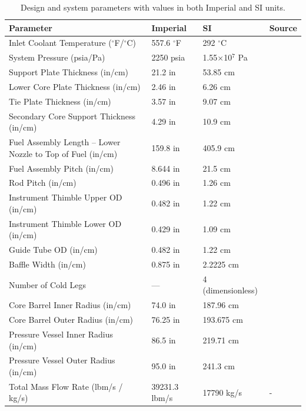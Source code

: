 \documentclass[review]{elsarticle}
\theoremstyle{definition}
\theoremstyle{definition}
\theoremstyle{remark}
\begin{document}
\begin{table}[!h]
\centering
\caption{Design and system parameters with values in both Imperial and SI units.}
\label{tab:design_data}
\renewcommand{\arraystretch}{1.2} %
\begin{tabular}{|l|l|l|l|}
\hline
\textbf{Parameter} & \textbf{Imperial} & \textbf{SI} & \textbf{Source} \\
\hline
Inlet Coolant Temperature ($^\circ$F/$^\circ$C) & 557.6 $^\circ$F & 292 $^\circ$C & \cite{ornl_sysdefdoc} \\
\hline
System Pressure (psia/Pa) & 2250 psia & 1.55$\times$10$^7$ Pa & \cite{horelik2013benchmark} \\
\hline
Support Plate Thickness (in/cm) & 21.2 in & 53.85 cm & \cite{wec_sysmanual} \\
\hline
Lower Core Plate Thickness (in/cm) & 2.46 in & 6.26 cm & \cite{wec_sysmanual} \\
\hline
Tie Plate Thickness (in/cm) & 3.57 in & 9.07 cm & \cite{wec_sysmanual} \\
\hline
Secondary Core Support Thickness (in/cm) & 4.29 in & 10.9 cm & \cite{wec_sysmanual} \\
\hline
Fuel Assembly Length – Lower Nozzle to Top of Fuel (in/cm) & 159.8 in & 405.9 cm & \cite{ornl_sysdefdoc} \\
\hline
Fuel Assembly Pitch (in/cm) & 8.644 in & 21.5 cm & \cite{ornl_sysdefdoc} \\
\hline
Rod Pitch (in/cm) & 0.496 in & 1.26 cm & \cite{ornl_sysdefdoc} \\
\hline
Instrument Thimble Upper OD (in/cm) & 0.482 in & 1.22 cm & \cite{ornl_sysdefdoc} \\
\hline
Instrument Thimble Lower OD (in/cm) & 0.429 in & 1.09 cm & \cite{ornl_sysdefdoc} \\
\hline
Guide Tube OD (in/cm) & 0.482 in & 1.22 cm & \cite{ornl_sysdefdoc} \\
\hline
Baffle Width (in/cm) & 0.875 in & 2.2225 cm & \cite{horelik2013benchmark} \\
\hline
Number of Cold Legs & --- & 4 (dimensionless) & \cite{ornl_sysdefdoc} \\
\hline
Core Barrel Inner Radius (in/cm) & 74.0 in & 187.96 cm & \cite{horelik2013benchmark} \\
\hline
Core Barrel Outer Radius (in/cm) & 76.25 in & 193.675 cm & \cite{horelik2013benchmark} \\
\hline
Pressure Vessel Inner Radius (in/cm) & 86.5 in & 219.71 cm & \cite{horelik2013benchmark} \\
\hline
Pressure Vessel Outer Radius (in/cm) & 95.0 in & 241.3 cm & \cite{horelik2013benchmark} \\
\hline
Total Mass Flow Rate (lbm/s / kg/s) & 39231.3 lbm/s & 17790 kg/s & - \\
\hline
\end{tabular}
\end{table}
\end{document}
